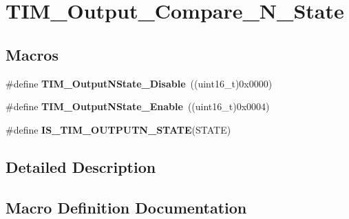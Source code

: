 \hypertarget{group___t_i_m___output___compare___n___state}{}\section{T\+I\+M\+\_\+\+Output\+\_\+\+Compare\+\_\+\+N\+\_\+\+State}
\label{group___t_i_m___output___compare___n___state}
\subsection*{Macros}
\begin{DoxyCompactItemize}
\item 
\#define {\bfseries T\+I\+M\+\_\+\+Output\+N\+State\+\_\+\+Disable}~((uint16\+\_\+t)0x0000)\hypertarget{group___t_i_m___output___compare___n___state_gade8506a50fd6ba58273e9da81f6b0b54}{}\label{group___t_i_m___output___compare___n___state_gade8506a50fd6ba58273e9da81f6b0b54}

\item 
\#define {\bfseries T\+I\+M\+\_\+\+Output\+N\+State\+\_\+\+Enable}~((uint16\+\_\+t)0x0004)\hypertarget{group___t_i_m___output___compare___n___state_gac4c08f9d66ce138c6978668020526c6f}{}\label{group___t_i_m___output___compare___n___state_gac4c08f9d66ce138c6978668020526c6f}

\item 
\#define {\bfseries I\+S\+\_\+\+T\+I\+M\+\_\+\+O\+U\+T\+P\+U\+T\+N\+\_\+\+S\+T\+A\+TE}(S\+T\+A\+TE)
\end{DoxyCompactItemize}


\subsection{Detailed Description}


\subsection{Macro Definition Documentation}
